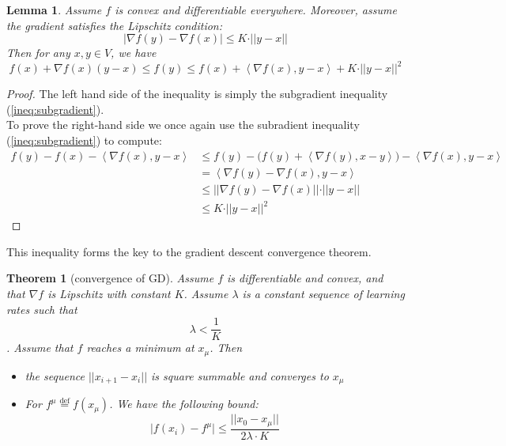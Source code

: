 \documentclass{book}
\theoremstyle{plain}
\newtheorem{theorem}[corollary]{Theorem}
\newtheorem{lemma}[corollary]{Lemma}
\theoremstyle{definition}
\newcommand{\bl}[2]{\left\langle #1,#2\right\rangle}
\newcommand{\define}{\stackrel{\operatorname{def}}{=}}
\begin{document}
\begin{lemma}
Assume $f$ is convex and differentiable everywhere. Moreover, assume the gradient satisfies the Lipschitz condition:
\[
\vert  \nabla f(y)-\nabla f(x) \vert \le K\cdot \vert \vert y-x\vert \vert 
\]	
Then for any $x,y \in V$, we have
\[
f(x)+\nabla f(x)(y-x) \le f(y)\le f(x)+\bl{\nabla f(x)}{y-x} + K \cdot \vert \vert y-x\vert \vert ^2
\]
\end{lemma}

\begin{proof}
The left hand side of the inequality is simply the subgradient inequality (\ref{ineq:subgradient}).\\
To prove the right-hand side we once again use the subradient inequality (\ref{ineq:subgradient}) to compute:
\begin{align*}
f(y)-f(x)-\bl{\nabla f(x)}{y-x}&\le f(y)-\bigg(f(y)+\bl{\nabla f(y)}{x-y}\bigg)-\bl{\nabla f(x)}{y-x}\\
&=\bl{\nabla f(y)-\nabla f(x)}{y-x}\\
&\le \vert \vert \nabla f(y)-\nabla f(x)\vert \vert \cdot \vert \vert y-x\vert \vert\\
&\le K\cdot \vert \vert y-x\vert \vert ^2
\end{align*}

\end{proof}

This inequality forms the key to the gradient descent convergence theorem.
\begin{theorem}[convergence of GD]
Assume $f$ is differentiable and convex, and  that $\nabla f$ is Lipschitz with constant $K$. Assume $\lambda$ is a constant sequence of learning rates such that 
\[\lambda <\frac{1}{K}\]. Assume that $f$ reaches a minimum at $x_\mu$. Then
\begin{itemize}
\item the sequence $\vert \vert x_{i+1}-x_i\vert \vert$ is square summable and converges to $x_\mu$
\item  For $f^\mu\define f(x_\mu)$. We have the following bound:
\[
\vert f(x_i)-f^\mu \vert \le \frac{\vert \vert x_0-x_\mu \vert \vert }{ 2\lambda \cdot K}
\]	
\end{itemize}
\end{theorem}
\end{document}
